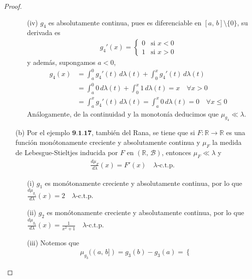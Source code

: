 \documentclass[12pt]{article}
\begin{document}
\begin{proof}
\begin{itemize}
\begin{itemize}
                  \item[(iv)] \(g_4 \) es absolutamente continua, pues es diferenciable en \([a \text{, }b] \setminus \{0\} \), su derivada es \begin{align*}
                            g_4'(x) = \begin{cases}
                                          0 & \text{si } x < 0 \\
                                          1 & \text{si } x > 0
                                      \end{cases}
                        \end{align*} y además, supongamos \(a < 0 \), \begin{align*}
                            g_4(x) & = \int_a^0 g_4'(t) \, d\lambda(t) + \int_0^x g_4'(t) \, d\lambda(t)                      \\
                                   & = \int_a^0 0 \, d\lambda(t) + \int_0^x 1 \, d\lambda(t) = x \quad \forall x > 0          \\
                                   & = \int_a^x g_4'(t) \, d\lambda(t) = \int_a^x 0 \, d\lambda(t) = 0 \quad \forall x \leq 0
                        \end{align*}
                        Análogamente, de la continuidad y la monotonía deducimos que \(\mu_{g_4} \ll \lambda \).
              \end{itemize}
        \item[(b)] Por el ejemplo \(\textbf{9.1.17} \), también del Rana, se tiene que si \(F: \mathbb{R} \to \mathbb{R} \) es una función monótonamente creciente y absolutamente continua y \(\mu_F \) la medida de Lebesgue-Stieltjes inducida por \(F \) en \((\mathbb{R}\text{, } \mathcal{B}) \),
              entonces \(\mu_F \ll \lambda \) y \begin{align*}
                  \frac{d\mu_F}{d\lambda}(x) = F'(x) \quad \lambda\text{-c.t.p.}
              \end{align*}
              \begin{itemize}
                  \item[(i)] \(g_1 \) es monótonamente creciente y absolutamente continua, por lo que \(\frac{d\mu_{g_1}}{d\lambda}(x) = 2 \quad \lambda\text{-c.t.p.} \)
                  \item[(ii)] \(g_2 \) es monótonamente creciente y absolutamente continua, por lo que \(\frac{d\mu_{g_2}}{d\lambda}(x) = \frac{1}{x^2 + 1} \quad \lambda\text{-c.t.p.} \)
                  \item[(iii)] Notemos que \begin{align*}\mu_{g_3}((a\text{, }b]) = g_3(b) - g_3(a) = \begin{cases}

\end{cases}
\end{align*}
\end{itemize}
\end{itemize}
\end{proof}
\end{document}
